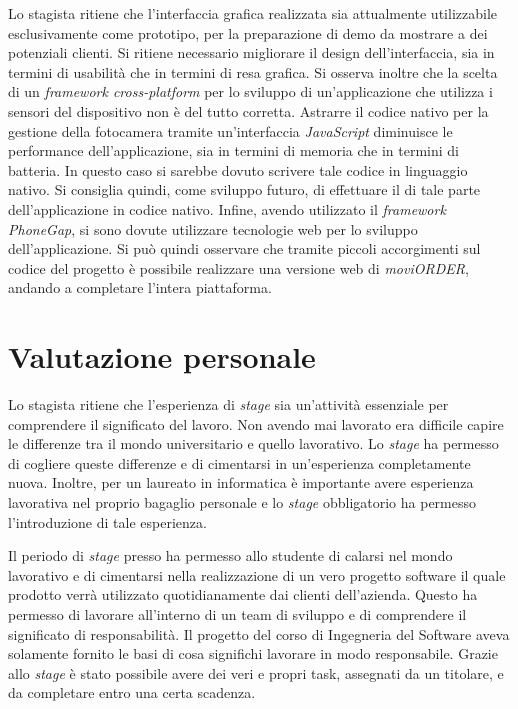Lo stagista ritiene che l'interfaccia grafica realizzata sia attualmente utilizzabile esclusivamente come prototipo, per la preparazione di demo da mostrare a dei potenziali clienti. Si ritiene necessario migliorare il design dell'interfaccia, sia in termini di usabilità che in termini di resa grafica. 
Si osserva inoltre che la scelta di un \textit{framework cross-platform} per lo sviluppo di un'applicazione che utilizza i sensori del dispositivo non è del tutto corretta. Astrarre il codice nativo per la gestione della fotocamera tramite un'interfaccia \textit{JavaScript} diminuisce le performance dell'applicazione, sia in termini di memoria che in termini di batteria. In questo caso si sarebbe dovuto scrivere tale codice in linguaggio nativo. Si consiglia quindi, come sviluppo futuro, di effettuare il  di tale parte dell'applicazione in codice nativo.
Infine, avendo utilizzato il \textit{framework PhoneGap}, si sono dovute utilizzare tecnologie web per lo sviluppo dell'applicazione. Si può quindi osservare che tramite piccoli accorgimenti sul codice del progetto è possibile realizzare una versione web di \textit{moviORDER}, andando a completare l'intera piattaforma.

\section{Valutazione personale}

Lo stagista ritiene che l'esperienza di \textit{stage} sia un'attività essenziale per comprendere il significato del lavoro. Non avendo mai lavorato era difficile capire le differenze tra il mondo universitario e quello lavorativo. Lo \textit{stage} ha permesso di cogliere queste differenze e di cimentarsi in un'esperienza completamente nuova. Inoltre, per un laureato in informatica è importante avere esperienza lavorativa nel proprio bagaglio personale e lo \textit{stage} obbligatorio ha permesso l'introduzione di tale esperienza.

Il periodo di \textit{stage} presso \visione{} ha permesso allo studente di calarsi nel mondo lavorativo e di cimentarsi nella realizzazione di un vero progetto software il quale prodotto verrà utilizzato quotidianamente dai clienti dell'azienda. Questo ha permesso di lavorare all'interno di un team di sviluppo e di comprendere il significato di responsabilità. Il progetto del corso di Ingegneria del Software aveva solamente fornito le basi di cosa significhi lavorare in modo responsabile. Grazie allo \textit{stage} è stato possibile avere dei veri e propri task, assegnati da un titolare, e da completare entro una certa scadenza.


